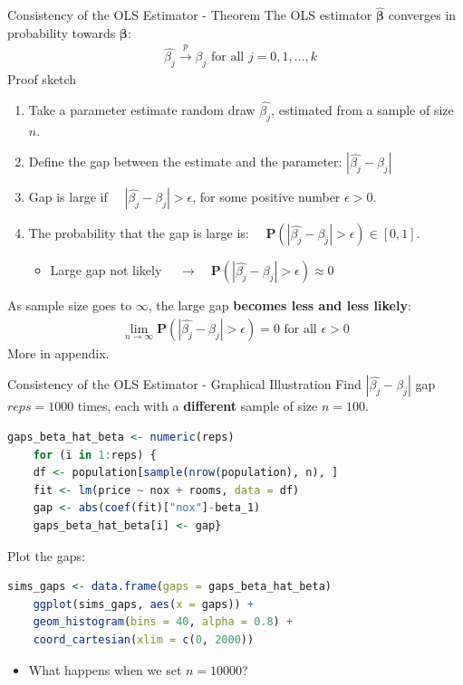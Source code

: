 \documentclass[11pt, aspectratio = 169]{beamer}
\begin{document}
\begin{frame}{Consistency of the OLS Estimator - Theorem}
The OLS estimator $\hat{\boldsymbol{\beta}}$ converges in probability towards $\boldsymbol{\beta}$:
\begin{align*}
 &   \hat{\beta_j} \xrightarrow{p} \beta_j \text{ for all } j = 0,1,...,k
\end{align*}
Proof sketch
\begin{enumerate}
    \item Take a parameter estimate random draw $\hat{\beta_j}$, estimated from a sample of size $n$.
    \item Define the gap between the estimate and the parameter: $|\hat{\beta_j} - \beta_j |$
    \item Gap is large if $\quad |\hat{\beta_j} - \beta_j |  > \epsilon$, for some positive number $\epsilon > 0$.
    \pause
    \item The probability that the gap is large is: $\quad \mathbf{P}(|\hat{\beta_j} - \beta_j |  > \epsilon) \in [0,1]$.
    \begin{itemize}
        \item Large gap not likely $\quad \rightarrow \quad \mathbf{P}(|\hat{\beta_j} - \beta_j |  > \epsilon) \approx 0$
    \end{itemize}
\end{enumerate}
\pause
As sample size goes to $\infty$, the large gap \textbf{becomes less and less likely}:
\begin{align*} \lim_{n \to \infty} \mathbf{P}(|\hat{\beta_j} - \beta_j |  > \epsilon) = 0   \text{ for all } \epsilon > 0
\end{align*}
More in appendix.
\end{frame}

\begin{frame}[fragile]{Consistency of the OLS Estimator - Graphical Illustration}
    Find $|\hat{\beta_j} - \beta_j |$ gap $reps = 1000$ times, each with a \textbf{different} sample of size $n = 100$.
    \begin{lstlisting}[language=R]      
    gaps_beta_hat_beta <- numeric(reps)
    for (i in 1:reps) {
    df <- population[sample(nrow(population), n), ]
    fit <- lm(price ~ nox + rooms, data = df)
    gap <- abs(coef(fit)["nox"]-beta_1)
    gaps_beta_hat_beta[i] <- gap}
    \end{lstlisting}   
    \pause
    Plot the gaps:
    \begin{lstlisting}[language=R]      
    sims_gaps <- data.frame(gaps = gaps_beta_hat_beta)
    ggplot(sims_gaps, aes(x = gaps)) +
    geom_histogram(bins = 40, alpha = 0.8) +
    coord_cartesian(xlim = c(0, 2000))
    \end{lstlisting}   
    \pause
    \begin{itemize}
        \item[$\rightarrow$] What happens when we set $n = 10000$?
    \end{itemize}
\end{frame}
\end{document}

